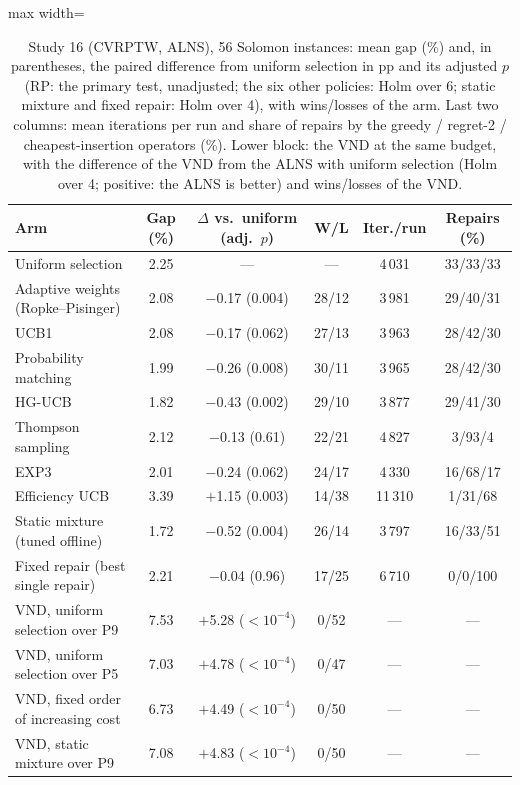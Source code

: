 \begin{table}[t]
\caption{Study 16 (CVRPTW, ALNS), 56 Solomon instances: mean gap (\%) and, in parentheses, the paired difference from uniform selection in pp and its adjusted $p$ (RP: the primary test, unadjusted; the six other policies: Holm over 6; static mixture and fixed repair: Holm over 4), with wins/losses of the arm. Last two columns: mean iterations per run and share of repairs by the greedy / regret-2 / cheapest-insertion operators (\%). Lower block: the VND at the same budget, with the difference of the VND from the ALNS with uniform selection (Holm over 4; positive: the ALNS is better) and wins/losses of the VND.}\label{tab:s16a}
\centering
\small
\begin{adjustbox}{max width=\linewidth}
\begin{tabular}{lccccc}
\toprule
Arm & Gap (\%) & $\Delta$ vs.\ uniform (adj.\ $p$) & W/L & Iter./run & Repairs (\%) \\
\midrule
Uniform selection & 2.25 & --- & --- & 4\,031 & 33/33/33 \\
Adaptive weights (Ropke--Pisinger) & 2.08 & $-$0.17 (0.004) & 28/12 & 3\,981 & 29/40/31 \\
UCB1 & 2.08 & $-$0.17 (0.062) & 27/13 & 3\,963 & 28/42/30 \\
Probability matching & 1.99 & $-$0.26 (0.008) & 30/11 & 3\,965 & 28/42/30 \\
HG-UCB & 1.82 & $-$0.43 (0.002) & 29/10 & 3\,877 & 29/41/30 \\
Thompson sampling & 2.12 & $-$0.13 (0.61) & 22/21 & 4\,827 & 3/93/4 \\
EXP3 & 2.01 & $-$0.24 (0.062) & 24/17 & 4\,330 & 16/68/17 \\
Efficiency UCB & 3.39 & $+$1.15 (0.003) & 14/38 & 11\,310 & 1/31/68 \\
Static mixture (tuned offline) & 1.72 & $-$0.52 (0.004) & 26/14 & 3\,797 & 16/33/51 \\
Fixed repair (best single repair) & 2.21 & $-$0.04 (0.96) & 17/25 & 6\,710 & 0/0/100 \\
\addlinespace
VND, uniform selection over P9 & 7.53 & $+$5.28 (\ensuremath{<10^{-4}}) & 0/52 & --- & --- \\
VND, uniform selection over P5 & 7.03 & $+$4.78 (\ensuremath{<10^{-4}}) & 0/47 & --- & --- \\
VND, fixed order of increasing cost & 6.73 & $+$4.49 (\ensuremath{<10^{-4}}) & 0/50 & --- & --- \\
VND, static mixture over P9 & 7.08 & $+$4.83 (\ensuremath{<10^{-4}}) & 0/50 & --- & --- \\
\bottomrule
\end{tabular}
\end{adjustbox}
\end{table}
